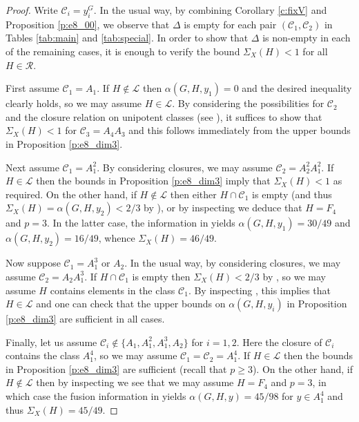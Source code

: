 \documentclass[twoside,a4paper,reqno,11pt]{amsart}
\renewcommand{\a}{\alpha}
\newcommand{\<}{\langle}
\renewcommand{\>}{\rangle}
\newcommand{\geqs}{\geqslant}
\renewcommand{\:}{\colon}
\theoremstyle{plain}
\theoremstyle{definition}
\begin{document}
\begin{proof}
Write $\mathcal{C}_i = y_i^G$. In the usual way, by combining Corollary \ref{c:fixV} and Proposition  \ref{p:e8_00}, we observe that $\Delta$ is empty for each pair $(\mathcal{C}_1,\mathcal{C}_2)$ in Tables \ref{tab:main} and \ref{tab:special}. In order to show that $\Delta$ is non-empty in each of the remaining cases, it is enough to verify the bound $\Sigma_X(H) <1$ for all $H \in \mathcal{R}$.  

First assume $\mathcal{C}_1 = A_1$. If $H \not\in \mathcal{L}$ then $\a(G,H,y_1) = 0$ and the desired inequality clearly holds, so we may assume $H \in \mathcal{L}$. By considering the possibilities for $\mathcal{C}_2$ and the closure relation on unipotent classes (see \cite[Chapter 4]{Spal}), it suffices to show that $\Sigma_X(H)<1$ for $\mathcal{C}_3 = A_4A_3$ and this follows immediately from the upper bounds in Proposition \ref{p:e8_dim3}. 

Next assume $\mathcal{C}_1 = A_1^2$. By considering closures, we may assume $\mathcal{C}_2 = A_2^2A_1^2$. If $H \in \mathcal{L}$ then the bounds in Proposition \ref{p:e8_dim3} imply that $\Sigma_X(H)<1$ as required. On the other hand, if $H \not\in \mathcal{L}$ then either $H \cap \mathcal{C}_1$ is empty (and thus $\Sigma_X(H) = \a(G,H,y_2) < 2/3$ by \cite[Theorem 3.1]{BGG1}), or by inspecting \cite{CST,Law2} we deduce that $H = F_4$ and $p=3$. In the latter case, the information in \cite[Table 2]{CST} yields $\a(G,H,y_1) = 30/49$ and $\a(G,H,y_2) = 16/49$, whence $\Sigma_X(H) = 46/49$. 

Now suppose $\mathcal{C}_1 = A_1^3$ or $A_2$. In the usual way, by considering closures, we may assume $\mathcal{C}_2 = A_2A_1^3$. If $H \cap \mathcal{C}_1$ is empty then $\Sigma_X(H)<2/3$ by \cite[Theorem 3.1]{BGG1}, so we may assume $H$ contains elements in the class $\mathcal{C}_1$. By inspecting \cite{CST,Law2}, this implies that $H \in \mathcal{L}$ and one can check that the upper bounds on $\a(G,H,y_i)$ in Proposition \ref{p:e8_dim3} are sufficient in all cases.

Finally, let us assume $\mathcal{C}_i \not\in \{A_1,A_1^2,A_1^3,A_2\}$ for $i=1,2$. Here the closure of $\mathcal{C}_i$ contains the class $A_1^4$, so we may assume $\mathcal{C}_1 = \mathcal{C}_2 = A_1^4$. If $H \in \mathcal{L}$ then the bounds in Proposition \ref{p:e8_dim3} are sufficient (recall that $p \geqs 3$). On the other hand, if $H \not\in \mathcal{L}$ then by inspecting \cite{CST,Law2} we see that we may assume $H = F_4$ and $p=3$, in which case the fusion information in \cite[Table 2]{CST} yields $\a(G,H,y) = 45/98$ for $y \in A_1^4$ and thus $\Sigma_X(H) = 45/49$.
\end{proof}
\end{document}
